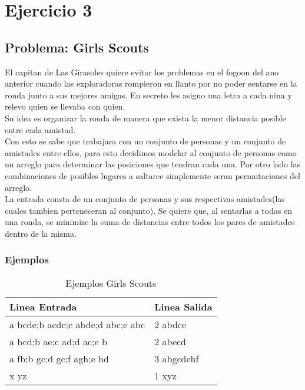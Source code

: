 \section{Ejercicio 3}

\subsection{Problema: Girls Scouts}
El capitan de Las Girasoles quiere evitar los problemas en el fogoon del ano anterior cuando las exploradoras rompieron en llanto por no poder sentarse en la ronda junto a sus mejores amigas. En secreto les asigno una letra a cada nina y relevo quien se llevaba con quien. \\
Su idea es organizar la ronda de manera que exista la menor distancia posible entre cada amistad. \\

Con esto se sabe que trabajara con un conjunto de personas y un conjunto de amistades entre ellos, para esto decidimos modelar al conjunto de personas como un arreglo para determinar las posiciones que tendran cada una. Por otro lado las combinaciones de posibles lugares a saltarce simplemente seran permutaciones del arreglo. \\

La entrada consta de un conjunto de personas y sus respectivas amistades(las cuales tambien perteneceran al conjunto). Se quiere que, al sentarlas a todas en una ronda, se minimize la suma de distancias entre todos los pares de amistades dentro de la misma.

\subsubsection{Ejemplos}

\begin{table}[htb]
\centering
\begin{tabular}{|l|l|}
\hline
Linea Entrada                    & Linea Salida \\ \hline
a bcde;b acde;c abde;d abc;e abc & 2 abdce      \\ \hline
a bcd;b ae;c ad;d ac;e b         & 2 abecd      \\ \hline
a fb;b gc;d gc;f agh;e hd        & 3 abgcdehf   \\ \hline
x yz                             & 1 xyz        \\ \hline
\end{tabular}
\caption{Ejemplos Girls Scouts}
\label{my-label}
\end{table}



